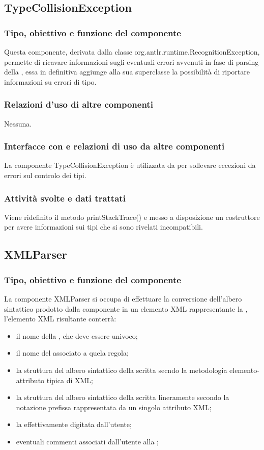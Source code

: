 \documentclass[11pt,titlepage,a4paper]{report}
\begin{document}
\subsection{TypeCollisionException}
\subsubsection{Tipo, obiettivo e funzione del componente}
Questa componente, derivata dalla classe org.antlr.runtime.RecognitionException, permette di ricavare informazioni sugli eventuali errori avvenuti in fase di parsing della \br, essa in definitiva aggiunge alla sua superclasse la possibilit\`a di riportare informazioni su errori di tipo.
\subsubsection{Relazioni d'uso di altre componenti}
Nessuna.
\subsubsection{Interfacce con e relazioni di uso da altre componenti}
La componente TypeCollisionException \`e utilizzata da \brp per sollevare eccezioni da errori sul controlo dei tipi.
\subsubsection{Attivit\`a svolte e dati trattati}
Viene ridefinito il metodo printStackTrace() e messo a disposizione un costruttore per avere informazioni sui tipi che si sono rivelati incompatibili.

\subsection{XMLParser}%
\subsubsection{Tipo, obiettivo e funzione del componente}
La componente XMLParser si occupa di effettuare la conversione dell'albero sintattico prodotto dalla componente \brp in un elemento XML rappresentante la \br, l'elemento XML risultante conterr\`a:
\begin{itemize}
 \item il nome della \br, che deve essere univoco;
 \item il nome del \bo associato a quela regola;
 \item la struttura del albero sintattico della \br scritta secndo la metodologia elemento-attributo tipica di XML;
 \item la struttura del albero sintattico della \br scritta lineramente secondo la notazione prefissa rappresentata da un singolo attributo XML;
 \item la \br effettivamente digitata dall'utente;
 \item eventuali commenti associati dall'utente alla \br;
\end{itemize}
\end{document}
